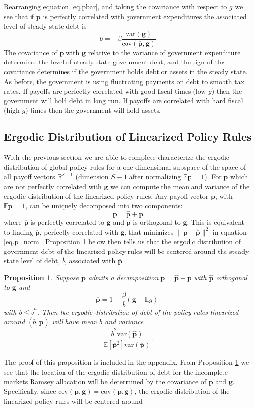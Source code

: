\documentclass[12pt]{article}
\newcommand{\EE}{\mathbb E}
\newtheorem{proposition}[theorem]{Proposition}
\newcommand{\var}{\text{var}}
\newcommand{\cov}{\text{cov}}
\begin{document}
Rearranging equation \eqref{eq.pbar}, and taking the covariance with respect to $g$ we see that if $\overline{\bm p}$ is perfectly correlated with government expenditures the associated level of steady state debt is
\[
	\overline b = -\beta \frac{\var(\bm g)}{\cov(\overline{\bm p},\bm g)}
\]The covariance of $\overline{\bm p}$ with $\bm g$ relative to the variance of government expenditure determines the level of steady state government debt, and the sign of the covariance determines if the government holds debt or assets in the steady state.  As before, the government is using fluctuating payments on debt to smooth tax rates.  If payoffs are perfectly correlated with good fiscal times (low $g$) then the government will hold debt in long run.  If payoffs are correlated with hard fiscal (high $g$) times then the government will hold assets.
\subsection{Ergodic Distribution of Linearized Policy Rules}
With the previous section we are able to complete characterize the ergodic distribution of global policy rules for a one-dimensional subspace of the space of all payoff vectors $\mathbb R^{S-1}$ (dimension $S-1$ after normalizing $\EE\bm p = 1$).  For $\bm p$ which are not perfectly correlated with $\bm g$ we can compute the mean and variance of the ergodic distribution of the linearized policy rules.  Any payoff vector $\bm p$, with $\EE\bm p =1$, can be uniquely decomposed into two components:
\[
	\bm p = \hat{\bm p} +\overline{\bm p}
\] where $\overline{\bm p}$ is perfectly correlated to $\bm g$ and $\hat{\bm p}$ is orthogonal to $\bm g$.  This is equivalent to finding $\overline{\bm p}$, perfectly correlated with $\bm g$, that minimizes  $\|\bm p-\overline{\bm p}\|^2$ in equation \eqref{eq.p_norm}.  Proposition \ref{prop.erg_lin} below then tells us that the ergodic distribution of government debt of the linearized policy rules will be centered around the steady state level of debt, $\overline b$, associated with $\overline{\bm p}$
\begin{proposition}\label{prop.erg_lin}
Suppose $\bm p$ admits a decomposition $\bm p = \hat{\bm p} +\overline{\bm p}$ with $\hat{\bm p}$ orthogonal to $\bm g$ and
\[
	\overline{\bm p} = 1- \frac{\beta}{\overline b}(\bm g - \EE g).
\] with $\overline b \leq \overline b^n$.  Then the ergodic distribution of debt of the policy rules linearized around $(\overline b, \overline{\bm p})$ will have mean $\overline b$ and variance
\begin{equation}\label{eq.var_lin}
	\frac{\overline b^2 \var(\hat{\bm p})}{\EE[\overline{\bm p}^2]\var(\overline{\bm p})}.
\end{equation}
\end{proposition}  The proof of this proposition is included in the appendix.  From Proposition \ref{prop.erg_lin}  we see that the location of the ergodic distribution of debt for the incomplete markets Ramsey allocation will be determined by the covariance of $\bm p$ and $\bm g$.  Specifically, since $\cov(\bm p,\bm g) = \cov(\overline{\bm p},\bm g)$, the ergodic distribution of the linearized policy rules will be centered around
\end{document}
